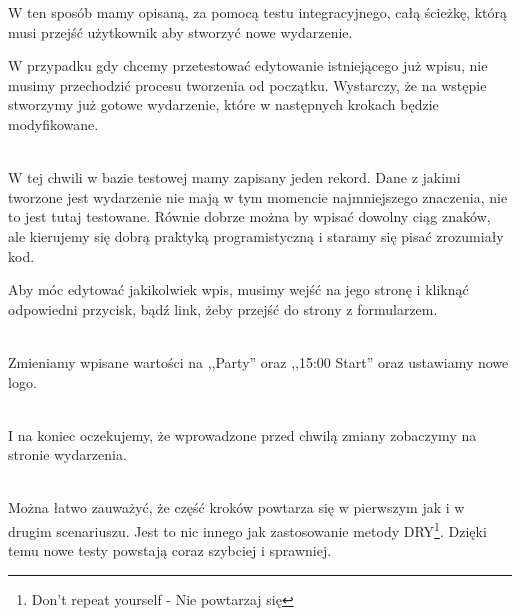 W ten sposób mamy opisaną, za pomocą testu integracyjnego, całą ścieżkę, którą musi przejść użytkownik aby stworzyć nowe wydarzenie.

W przypadku gdy chcemy przetestować edytowanie istniejącego już wpisu, nie musimy przechodzić procesu tworzenia od początku. Wystarczy, że na wstępie stworzymy już gotowe wydarzenie, które w następnych krokach będzie modyfikowane.

\begin{code}
	
\end{code}\\

W tej chwili w bazie testowej mamy zapisany jeden rekord. Dane z jakimi tworzone jest wydarzenie nie mają w tym momencie najmniejszego znaczenia, nie to jest tutaj testowane. Równie dobrze można by wpisać dowolny ciąg znaków, ale kierujemy się dobrą praktyką programistyczną i staramy się pisać zrozumiały kod.

Aby móc edytować jakikolwiek wpis, musimy wejść na jego stronę i kliknąć odpowiedni przycisk, bądź link, żeby przejść do strony z formularzem.

\begin{code}
	
\end{code}\\

Zmieniamy wpisane wartości na ,,Party'' oraz ,,15:00 Start'' oraz ustawiamy nowe logo.

\begin{code}
	
\end{code}\\

I na koniec oczekujemy, że wprowadzone przed chwilą zmiany zobaczymy na stronie wydarzenia.

\begin{code}
	
\end{code}\\

Można łatwo zauważyć, że część kroków powtarza się w pierwszym jak i w drugim scenariuszu. Jest to nic innego jak zastosowanie metody DRY\footnote{Don't repeat yourself - Nie powtarzaj się}. Dzięki temu nowe testy powstają coraz szybciej i sprawniej.

